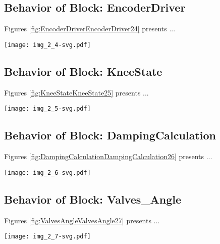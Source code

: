\subsection{Behavior of Block: EncoderDriver}
Figures \ref{fig:EncoderDriverEncoderDriver24} presents ...
\begin{figure*}[htb]
\centering
\texttt{[image: img\_2\_4-svg.pdf]}
\caption{Diagram "Behavior of Block: EncoderDriver"}
\label{fig:EncoderDriverEncoderDriver24}
\end{figure*}

\subsection{Behavior of Block: KneeState}
Figures \ref{fig:KneeStateKneeState25} presents ...
\begin{figure*}[htb]
\centering
\texttt{[image: img\_2\_5-svg.pdf]}
\caption{Diagram "Behavior of Block: KneeState"}
\label{fig:KneeStateKneeState25}
\end{figure*}

\subsection{Behavior of Block: DampingCalculation}
Figures \ref{fig:DampingCalculationDampingCalculation26} presents ...
\begin{figure*}[htb]
\centering
\texttt{[image: img\_2\_6-svg.pdf]}
\caption{Diagram "Behavior of Block: DampingCalculation"}
\label{fig:DampingCalculationDampingCalculation26}
\end{figure*}

\subsection{Behavior of Block: Valves\_Angle}
Figures \ref{fig:ValvesAngleValvesAngle27} presents ...
\begin{figure*}[htb]
\centering
\texttt{[image: img\_2\_7-svg.pdf]}
\caption{Diagram "Behavior of Block: Valves\_Angle"}
\label{fig:ValvesAngleValvesAngle27}
\end{figure*}

